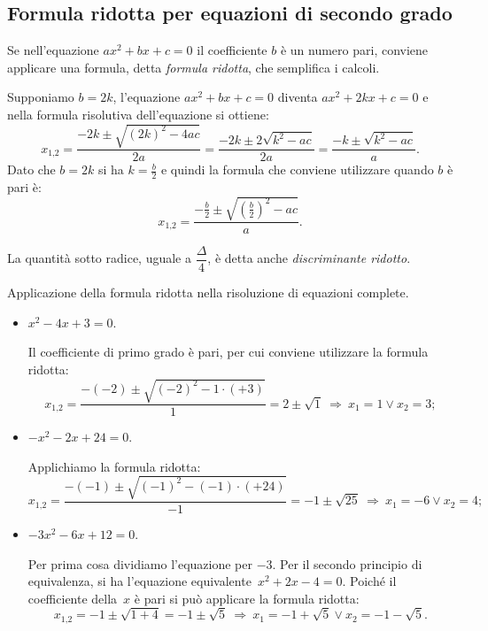 \subsection{Formula ridotta per equazioni di secondo grado}

Se nell'equazione
$a x^{2} + b x + c=0$ il coefficiente $b$ è un numero pari, conviene applicare una formula, detta \emph{formula ridotta}, che semplifica i calcoli.

Supponiamo $b=2 k$, l'equazione $a x^{2} + b x + c=0$ diventa $a x^{2} + 2 k x + c=0$ e nella formula risolutiva dell'equazione si ottiene:
\[x_{1\text{,}2}=\frac{- 2 k \pm \sqrt{( 2 k )^{2}-4 a c}}{2 a}=\frac{- 2 k \pm 2 \sqrt{k^{2} - a c}}{2 a}=\frac{- k \pm \sqrt{k^{2} - a c}}{a}.\]
Dato che $b=2 k$ si ha $k=\frac{b}{2}$ e quindi la formula che conviene utilizzare quando $b$ è pari è:
\[x_{1\text{,}2}=\frac{-\frac{b}{2} \pm \sqrt{\left(\frac{b}{2} \right)^{2} - a c}}{a}.\]

La quantità sotto radice, uguale a $\dfrac{\Delta}{4}$, è detta anche \emph{discriminante ridotto}.
\pagebreak
\begin{exrig}
\begin{esempio}
 Applicazione della formula ridotta nella risoluzione di equazioni complete.
\begin{itemize}
\item $x^{2} - 4 x + 3=0$.

 Il coefficiente di primo grado è pari, per cui conviene utilizzare la formula ridotta: 
\[x_{1\text{,}2}=\frac{-(-2 ) \pm \sqrt{(-2)^{2}-1\cdot(+3)}}{1}=2 \pm \sqrt{1}\:\Rightarrow\:  x_{1} = 1 \vee x_{2} = 3;\]
\item $- x^{2} - 2 x + 24=0$.

 Applichiamo la formula ridotta: 
\[x_{1\text{,}2}=\frac{- ( - 1 ) \pm \sqrt{( -1 )^{2} - (-1)\cdot(+24)}}{-1}=- 1 \pm \sqrt{25}\:\Rightarrow\: x_{1} = - 6 \vee x_{2} = 4;\]
\item $- 3 x^{2} - 6 x + 12=0$.

 Per prima cosa dividiamo l'equazione per $- 3$. Per il secondo principio di equivalenza, si ha l'equazione equivalente~$x^{2} + 2 x - 4=0$. Poiché il coefficiente della~$x$ è pari si può applicare la formula ridotta: 
\[x_{1\text{,}2}=- 1 \pm \sqrt{1 + 4} = - 1\pm \sqrt{5}\:\Rightarrow\: x_{1} = - 1 + \sqrt{5} \vee x_{2} = - 1 - \sqrt{5}.\]
\end{itemize}
\end{esempio}
\end{exrig}

